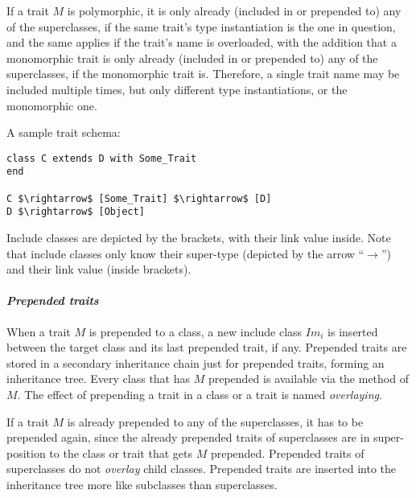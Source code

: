 If a trait $M$ is polymorphic, it is only already (included in or prepended to) any of the superclasses, if the same trait's type instantiation is the one in question, and the same applies if the trait's name is overloaded, with the addition that a monomorphic trait is only already (included in or prepended to) any of the superclasses, if the monomorphic trait is. Therefore, a single trait name may be included multiple times, but only different type instantiations, or the monomorphic one. 

\example A sample trait schema:
\begin{lstlisting}
class C extends D with Some_Trait
end

C $\rightarrow$ [Some_Trait] $\rightarrow$ [D]
D $\rightarrow$ [Object]
\end{lstlisting}
Include classes are depicted by the brackets, with their link value inside. Note that include classes only know their super-type (depicted by the arrow ``$\rightarrow$'') and their link value (inside brackets). 

\paragraph{\em Prepended traits}
When a trait $M$ is prepended to a class, a new include class $Im_i$ is inserted between the target class and its last prepended trait, if any. Prepended traits are stored in a secondary inheritance chain just for prepended traits, forming an inheritance tree. Every class that has $M$ prepended is available via the  method of $M$. The effect of prepending a trait in a class or a trait is named {\em overlaying}. 

If a trait $M$ is already prepended to any of the superclasses, it has to be prepended again, since the already prepended traits of superclasses are in super-position to the class or trait that gets $M$ prepended. Prepended traits of superclasses do not {\em overlay} child classes. Prepended traits are inserted into the inheritance tree more like subclasses than superclasses. 

